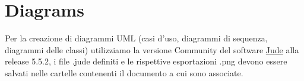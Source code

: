 \section{Diagrams}
Per la creazione di diagrammi UML (casi d'uso, diagrammi di sequenza, diagrammi delle classi) utilizziamo la versione Community del software \href{http://jude.change-vision.com/}{Jude} alla release 5.5.2, i file .jude definiti e le rispettive esportazioni .png devono essere salvati nelle cartelle contenenti il documento a cui sono associate.